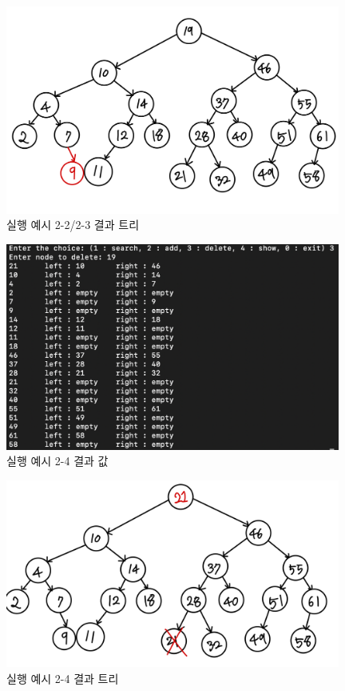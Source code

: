 \documentclass{article}
\begin{document}
\begin{figure}
\centering
   \includegraphics[width=11cm]{tree-3.jpeg}
   \hfil
\caption{실행 예시 2-2/2-3 결과 트리}
\label{tree-3}
\end{figure}


\begin{figure}
\centering
   \includegraphics[width=11cm]{ex_2-4.png}
   \hfil
\caption{실행 예시 2-4 결과 값}
\label{ex2-4}
\end{figure}

\begin{figure}
\centering
   \includegraphics[width=11cm]{tree-4.jpeg}
   \hfil
\caption{실행 예시 2-4 결과 트리}
\label{tree-4}
\end{figure}
\end{document}

